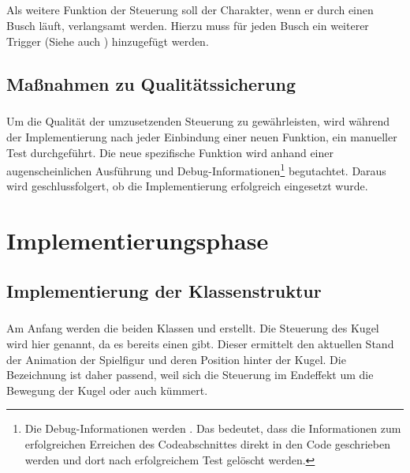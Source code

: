 \paragraph{}
Als weitere Funktion der Steuerung soll der Charakter, wenn er durch einen Busch läuft, verlangsamt werden. Hierzu muss für jeden Busch ein weiterer Trigger (Siehe auch ) hinzugefügt werden.

\section{Maßnahmen zu Qualitätssicherung}
\paragraph{}
Um die Qualität der umzusetzenden Steuerung zu gewährleisten, wird während der Implementierung nach jeder Einbindung einer neuen Funktion, ein manueller Test durchgeführt. Die neue spezifische Funktion wird anhand einer augenscheinlichen Ausführung und Debug-Informationen\footnote{Die Debug-Informationen werden . Das bedeutet, dass die Informationen zum erfolgreichen Erreichen des Codeabschnittes direkt in den Code geschrieben werden und dort nach erfolgreichem Test gelöscht werden.} begutachtet. Daraus wird geschlussfolgert, ob die Implementierung erfolgreich eingesetzt wurde.

\chapter{Implementierungsphase}
\section{Implementierung der Klassenstruktur}
\paragraph{}
Am Anfang werden die beiden Klassen  und  erstellt. Die Steuerung des Kugel wird hier  genannt, da es bereits einen  gibt. Dieser ermittelt den aktuellen Stand der Animation der Spielfigur und deren Position hinter der Kugel. Die Bezeichnung ist daher passend, weil sich die Steuerung im Endeffekt um die Bewegung der Kugel oder auch  kümmert. 
